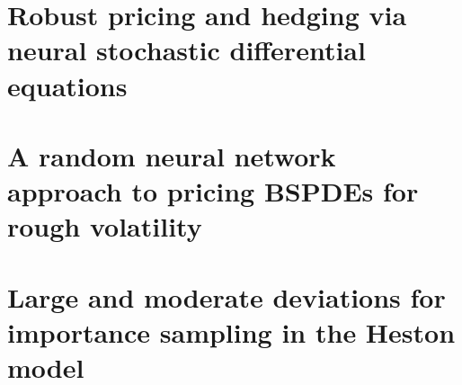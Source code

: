 \chapter[Robust pricing and hedging via neural SDEs]{Robust pricing and hedging via neural stochastic differential equations}


\chapter[Random neural networks for rough volatility BSPDEs]{A random neural network approach to pricing BSPDEs for rough volatility}


\chapter[Large and moderate deviations for importance sampling]{Large and moderate deviations for importance sampling in the Heston model}



